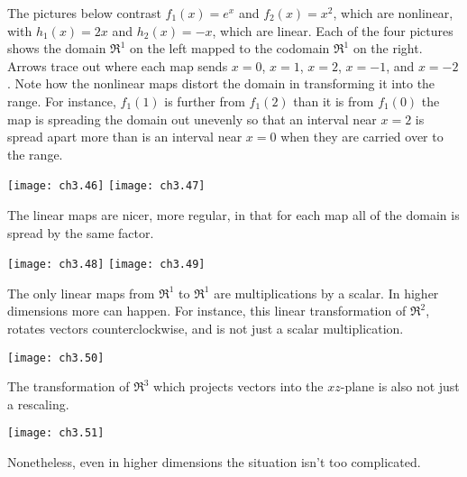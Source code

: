 The pictures below contrast 
\( f_1(x)=e^x \) and \( f_2(x)=x^2 \), which are nonlinear,
with \( h_1(x)=2x \) and \( h_2(x)=-x \), which are linear.
Each of the four pictures shows the domain $\Re^1$ on the left 
mapped to the codomain $\Re^1$ on the right. 
Arrows trace out where each map sends
$x=0$, $x=1$, $x=2$, $x=-1$, and $x=-2$.
Note how the nonlinear maps distort
the domain in transforming it into the range.
For instance,
\( f_1(1) \) is further from
$f_1(2)$ than it is from $f_1(0)$ \Dash  the map is spreading 
the domain out unevenly so that  
an interval near $x=2$ is spread apart more 
than is an interval near $x=0$
when they are carried over to the range.
\begin{center}
  \texttt{[image: ch3.46]}
  \hspace*{3em}
  \texttt{[image: ch3.47]}
\end{center}
The linear maps are nicer, more regular, 
in that for each map all of the domain is 
spread by the same factor.
\begin{center}
  \texttt{[image: ch3.48]}
  \hspace*{3em}
  \texttt{[image: ch3.49]}
\end{center}

The only linear maps from $\Re^1$ to $\Re^1$ are multiplications by a scalar. 
In higher dimensions more can happen. 
For instance, this linear transformation of $\Re^2$, 
rotates vectors counterclockwise, and is not just a scalar 
multiplication.
\begin{center}
  \texttt{[image: ch3.50]}
\end{center}
The transformation of $\Re^3$ 
which projects vectors into the $xz$-plane
is also not just a rescaling.
\begin{center}
 \texttt{[image: ch3.51]}
\end{center}
Nonetheless, even in higher dimensions the situation isn't too
complicated.

